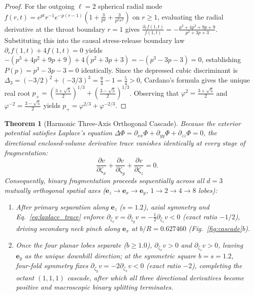 \documentclass[pdflatex,sn-mathphys-num]{sn-jnl}
\theoremstyle{thmstyleone}
\newtheorem{theorem}{Theorem}
\theoremstyle{thmstyletwo}
\theoremstyle{thmstylethree}
\begin{document}
\begin{proof}
For the outgoing $\ell=2$ spherical radial mode $f(r,t) = e^{pt} r^{-1} e^{-p(r-1)}(1 + \frac{3}{pr} + \frac{3}{p^2 r^2})$ on $r \ge 1$, evaluating the radial derivative at the throat boundary $r=1$ gives $\frac{\partial_r f(1,t)}{f(1,t)} = -\frac{p^3 + 4p^2 + 9p + 9}{p^2 + 3p + 3}$. Substituting this into the causal stress-release boundary law $\partial_r f(1,t) + 4f(1,t) = 0$ yields $-(p^3 + 4p^2 + 9p + 9) + 4(p^2 + 3p + 3) = -(p^3 - 3p - 3) = 0$, establishing $P(p) = p^3 - 3p - 3 = 0$ identically. Since the depressed cubic discriminant is $\Delta_3 = (-3/2)^2 + (-3/3)^3 = \frac{9}{4} - 1 = \frac{5}{4} > 0$, Cardano's formula gives the unique real root $p_+ = (\frac{3+\sqrt{5}}{2})^{1/3} + (\frac{3-\sqrt{5}}{2})^{1/3}$. Observing that $\varphi^2 = \frac{3+\sqrt{5}}{2}$ and $\varphi^{-2} = \frac{3-\sqrt{5}}{2}$ yields $p_+ = \varphi^{2/3} + \varphi^{-2/3}$.
\end{proof}

\begin{theorem}[Harmonic Three-Axis Orthogonal Cascade]\label{thm:cascade}
Because the exterior potential satisfies Laplace's equation $\Delta\Phi = \partial_{xx}\Phi + \partial_{yy}\Phi + \partial_{zz}\Phi = 0$, the directional enclosed-volume derivative trace vanishes identically at every stage of fragmentation:
\begin{equation}\label{eq:laplace_trace}
\frac{\partial v}{\partial\zeta_x} + \frac{\partial v}{\partial\zeta_y} + \frac{\partial v}{\partial\zeta_z} = 0.
\end{equation}
Consequently, binary fragmentation proceeds sequentially across all $d=3$ mutually orthogonal spatial axes ($\mathbf{e}_z \to \mathbf{e}_x \to \mathbf{e}_y$, $1 \to 2 \to 4 \to 8$ lobes):
\begin{enumerate}
\item After primary separation along $\mathbf{e}_z$ ($s=1.2$), axial symmetry and Eq.~\eqref{eq:laplace_trace} enforce $\partial_{\zeta_x}v = \partial_{\zeta_y}v = -\frac{1}{2}\partial_{\zeta_z}v < 0$ (exact ratio $-1/2$), driving secondary neck pinch along $\mathbf{e}_x$ at $b/R = 0.627460$ (Fig.~\ref{fig:cascade}b).
\item Once the four planar lobes separate ($b \ge 1.0$), $\partial_{\zeta_x}v > 0$ and $\partial_{\zeta_z}v > 0$, leaving $\mathbf{e}_y$ as the unique downhill direction; at the symmetric square $b=s=1.2$, four-fold symmetry fixes $\partial_{\zeta_y}v = -2\partial_{\zeta_x}v < 0$ (exact ratio $-2$), completing the octant $(1,1,1)$ cascade, after which all three directional derivatives become positive and macroscopic binary splitting terminates.
\end{enumerate}
\end{theorem}
\end{document}
